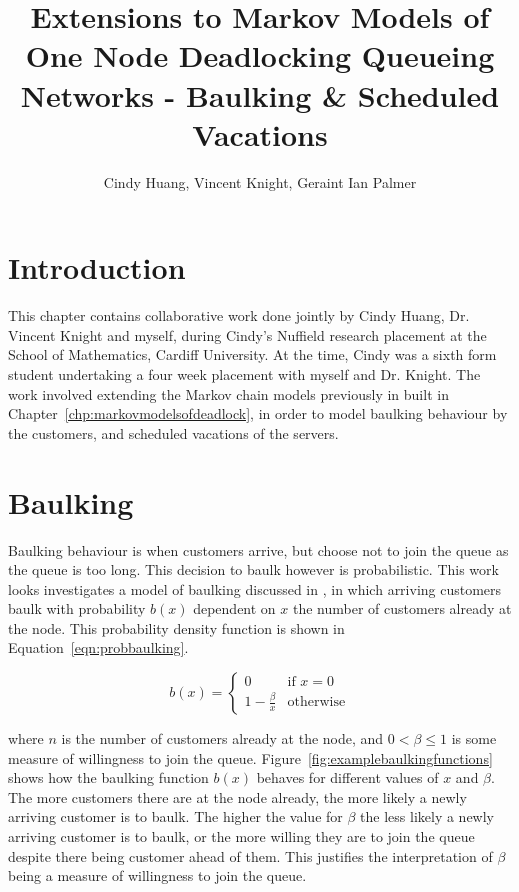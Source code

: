 \documentclass{article}
\title{Extensions to Markov Models of One Node Deadlocking Queueing Networks - Baulking \& Scheduled Vacations}
\author{Cindy Huang, Vincent Knight, Geraint Ian Palmer}
\date{}
\begin{document}
\onehalfspacing

\maketitle

\section{Introduction}

This chapter contains collaborative work done jointly by Cindy Huang, Dr. Vincent Knight and myself, during Cindy's Nuffield research placement \cite{nuffieldresearchplacements} at the School of Mathematics, Cardiff University.
At the time, Cindy was a sixth form student undertaking a four week placement with myself and Dr. Knight.
The work involved extending the Markov chain models previously in built in Chapter~\ref{chp:markovmodelsofdeadlock}, in order to model baulking behaviour by the customers, and scheduled vacations of the servers.


\section{Baulking}

Baulking behaviour is when customers arrive, but choose not to join the queue as the queue is too long.
This decision to baulk however is probabilistic.
This work looks investigates a model of baulking discussed in \cite{anckergafarian63}, in which arriving customers baulk with probability $b(x)$ dependent on $x$ the number of customers already at the node.
This probability density function is shown in Equation~\ref{eqn:probbaulking}.

\begin{equation}\label{eqn:probbaulking}
    b(x) = \left\{ \begin{array}{rr}
    0 & \text{if } x = 0\\
    1 - \frac{\beta}{x} & \text{otherwise}
    \end{array} \right.
\end{equation}

where $n$ is the number of customers already at the node, and $0 < \beta \leq 1$ is some measure of willingness to join the queue.
Figure~\ref{fig:examplebaulkingfunctions} shows how the baulking function $b(x)$ behaves for different values of $x$ and $\beta$.
The more customers there are at the node already, the more likely a newly arriving customer is to baulk.
The higher the value for $\beta$ the less likely a newly arriving customer is to baulk, or the more willing they are to join the queue despite there being customer ahead of them.
This justifies the interpretation of $\beta$ being a measure of willingness to join the queue.
\end{document}
